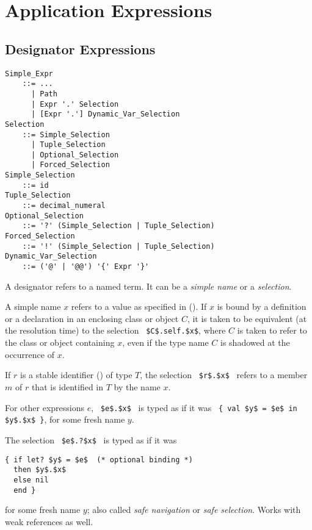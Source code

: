 \section{Application Expressions}







\subsection{Designator Expressions}
\label{sec:designators}

\grammar\begin{lstlisting}
Simple_Expr
    ::= ...
      | Path
      | Expr '.' Selection
      | [Expr '.'] Dynamic_Var_Selection
Selection 
    ::= Simple_Selection
      | Tuple_Selection
      | Optional_Selection
      | Forced_Selection
Simple_Selection 
    ::= id
Tuple_Selection
    ::= decimal_numeral
Optional_Selection 
    ::= '?' (Simple_Selection | Tuple_Selection)
Forced_Selection
    ::= '!' (Simple_Selection | Tuple_Selection)
Dynamic_Var_Selection
    ::= ('@' | '@@') '{' Expr '}'
\end{lstlisting}

A designator refers to a named term. It can be a {\em simple name} or a {\em selection}.

A simple name $x$ refers to a value as specified in (). If $x$ is bound by a definition or a declaration in an enclosing class or object $C$, it is taken to be equivalent (at the resolution time) to the selection ~\lstinline!$C$.self.$x$!, where $C$ is taken to refer to the class or object containing $x$, even if the type name $C$ is shadowed at the occurrence of $x$. 

If $r$ is a stable identifier () of type $T$, the selection ~\lstinline!$r$.$x$!~ refers to a member $m$ of $r$ that is identified in $T$ by the name $x$. 

For other expressions $e$, ~\lstinline!$e$.$x$!~ is typed as if it was ~\lstinline!{ val $y$ = $e$ in $y$.$x$ }!, for some fresh name $y$. 

The selection ~\lstinline!$e$.?$x$!~ is typed as if it was 
\begin{lstlisting}
{ if let? $y$ = $e$  (* optional binding *)
  then $y$.$x$ 
  else nil 
  end }
\end{lstlisting}
for some fresh name $y$; also called {\em safe navigation} or {\em safe selection}. Works with weak references as well. 

